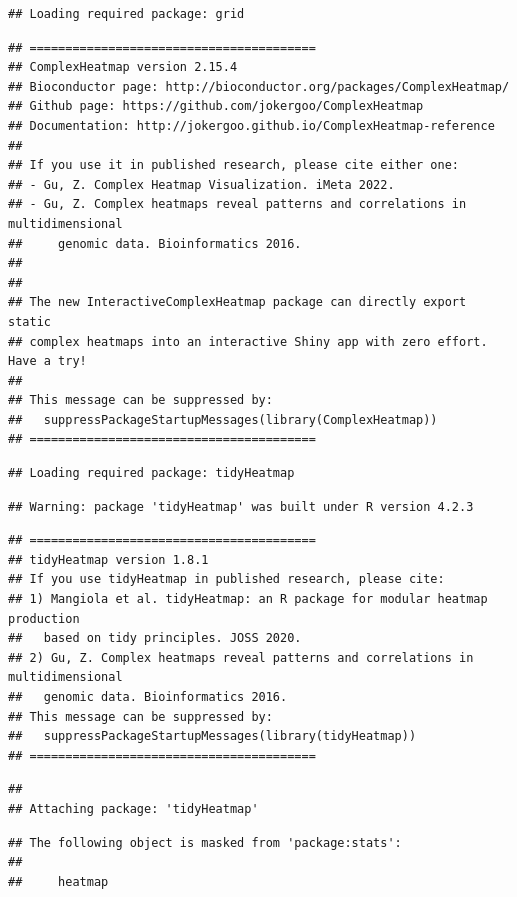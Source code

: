 \documentclass[
  12pt,
]{book}
\begin{document}
\begin{verbatim}
## Loading required package: grid
\end{verbatim}

\begin{verbatim}
## ========================================
## ComplexHeatmap version 2.15.4
## Bioconductor page: http://bioconductor.org/packages/ComplexHeatmap/
## Github page: https://github.com/jokergoo/ComplexHeatmap
## Documentation: http://jokergoo.github.io/ComplexHeatmap-reference
## 
## If you use it in published research, please cite either one:
## - Gu, Z. Complex Heatmap Visualization. iMeta 2022.
## - Gu, Z. Complex heatmaps reveal patterns and correlations in multidimensional 
##     genomic data. Bioinformatics 2016.
## 
## 
## The new InteractiveComplexHeatmap package can directly export static 
## complex heatmaps into an interactive Shiny app with zero effort. Have a try!
## 
## This message can be suppressed by:
##   suppressPackageStartupMessages(library(ComplexHeatmap))
## ========================================
\end{verbatim}

\begin{verbatim}
## Loading required package: tidyHeatmap
\end{verbatim}

\begin{verbatim}
## Warning: package 'tidyHeatmap' was built under R version 4.2.3
\end{verbatim}

\begin{verbatim}
## ========================================
## tidyHeatmap version 1.8.1
## If you use tidyHeatmap in published research, please cite:
## 1) Mangiola et al. tidyHeatmap: an R package for modular heatmap production 
##   based on tidy principles. JOSS 2020.
## 2) Gu, Z. Complex heatmaps reveal patterns and correlations in multidimensional 
##   genomic data. Bioinformatics 2016.
## This message can be suppressed by:
##   suppressPackageStartupMessages(library(tidyHeatmap))
## ========================================
\end{verbatim}

\begin{verbatim}
## 
## Attaching package: 'tidyHeatmap'
\end{verbatim}

\begin{verbatim}
## The following object is masked from 'package:stats':
## 
##     heatmap
\end{verbatim}
\end{document}

